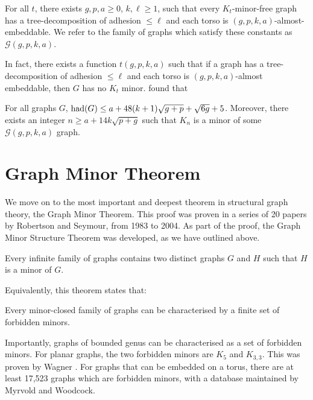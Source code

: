 \begin{theorem}
	For all \(t\), there exists \(g, p, a \geq 0\), \(k, \ell \geq 1\), such that every \(K_t\)-minor-free graph has a tree-decomposition of adhesion \(\leq \ell\) and each torso is \((g, p, k, a)\)-almost-embeddable. We refer to the family of graphs which satisfy these constants as \(\mathcal{G}(g, p, k, a)\). 
\end{theorem}
In fact, there exists a function \(t(g, p, k, a)\) such that if a graph has a tree-decomposition of adhesion \(\leq \ell\) and each torso is \((g, p, k, a)\)-almost embeddable, then \(G\) has no \(K_t\) minor. \textcite{joretCompleteGraphMinors2013} found that
\begin{theorem}\label{thm:graph_structure_bound_theorem}
	For all graphs \(G\),
	\(\operatorname{had}(G) \leq a + 48(k + 1)\sqrt{g + p} + \sqrt{6g} + 5\). Moreover, there exists an integer \(n \geq a + 1 4 k\sqrt{p + g}\) such that \(K_n\) is a minor of some \(\mathcal{G}(g, p, k, a)\) graph.
\end{theorem}

\section{Graph Minor Theorem}\label{sec:Graph Minor Theorem}
We move on to the most important and deepest theorem in structural graph theory, the Graph Minor Theorem. This proof was proven in a series of 20 papers by Robertson and Seymour, from 1983 to 2004. As part of the proof, the Graph Minor Structure Theorem was developed, as we have outlined above. 
\begin{theorem}
	Every infinite family of graphs contains two distinct graphs \(G\) and \(H\) such that \(H\) is a minor of \(G\).
\end{theorem}
Equivalently, this theorem states that:
\begin{theorem}
	Every minor-closed family of graphs can be characterised by a finite set of forbidden minors.
\end{theorem}
Importantly, graphs of bounded genus can be characterised as a set of forbidden minors.
For planar graphs, the two forbidden minors are \(K_5\) and \(K_{3,3}\). This was proven by Wagner \cite{wagnerUeberEigenschaftEbenen1937}. 
For graphs that can be embedded on a torus, there are at least 17,523 graphs which are forbidden minors, with a database maintained by Myrvold and Woodcock\cite{myrvoldLargeSetTorus2018}. 
